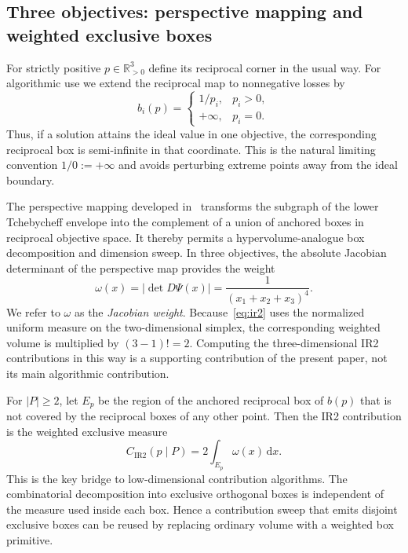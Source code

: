 \documentclass[runningheads]{llncs}
\newcommand{\IR}{\operatorname{IR2}}
\newcommand{\R}{\mathbb{R}}
\newcommand{\cIR}{C_{\IR}}
\begin{document}
\subsection{Three objectives: perspective mapping and weighted exclusive boxes}
\label{subsec:3d}

For strictly positive $p\in\R^3_{>0}$ define its reciprocal corner in the usual way. For algorithmic use we extend the reciprocal map to nonnegative losses by
\begin{equation}
\label{eq:extended-reciprocal}
    b_i(p)=
    \begin{cases}
      1/p_i, & p_i>0,\\
      +\infty, & p_i=0.
    \end{cases}
\end{equation}
Thus, if a solution attains the ideal value in one objective, the corresponding reciprocal box is semi-infinite in that coordinate. This is the natural limiting convention $1/0:=+\infty$ and avoids perturbing extreme points away from the ideal boundary.

The perspective mapping developed in~\cite{Emmerich2026Perspective} transforms the subgraph of the lower Tchebycheff envelope into the complement of a union of anchored boxes in reciprocal objective space. It thereby permits a hypervolume-analogue box decomposition and dimension sweep. In three objectives, the absolute Jacobian determinant of the perspective map provides the weight
\begin{equation}
\label{eq:density}
    \omega(x)=\left|\det D\Psi(x)\right|
    =\frac{1}{(x_1+x_2+x_3)^4}.
\end{equation}
We refer to $\omega$ as the \emph{Jacobian weight}. Because~\eqref{eq:ir2} uses the normalized uniform measure on the two-dimensional simplex, the corresponding weighted volume is multiplied by $(3-1)!=2$. Computing the three-dimensional IR2 contributions in this way is a supporting contribution of the present paper, not its main algorithmic contribution.

For $|P|\ge2$, let $E_p$ be the region of the anchored reciprocal box of $b(p)$ that is not covered by the reciprocal boxes of any other point. Then the IR2 contribution is the weighted exclusive measure
\begin{equation}
\label{eq:weighted-exclusive}
    \cIR(p\mid P)=2\int_{E_p}\omega(x)\,\mathrm{d}x.
\end{equation}
This is the key bridge to low-dimensional contribution algorithms. The combinatorial decomposition into exclusive orthogonal boxes is independent of the measure used inside each box. Hence a contribution sweep that emits disjoint exclusive boxes can be reused by replacing ordinary volume with a weighted box primitive.
\end{document}
